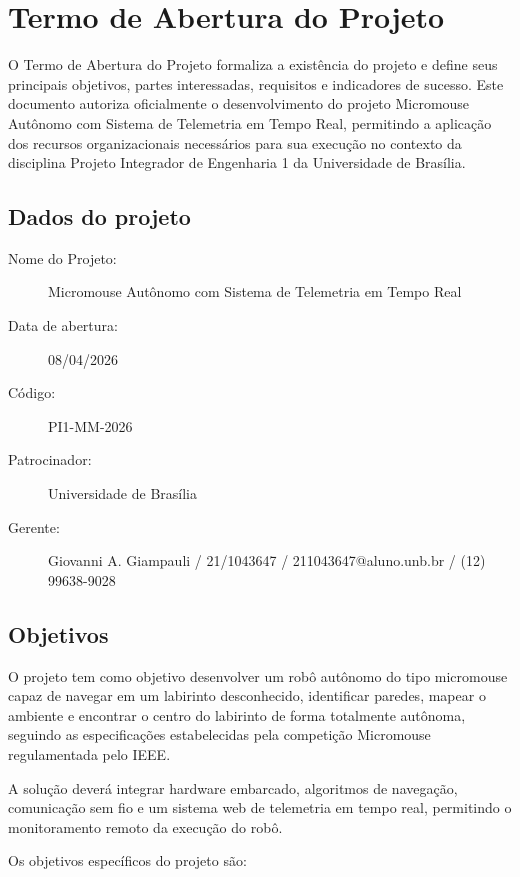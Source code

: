 \chapter{Termo de Abertura do Projeto}

O Termo de Abertura do Projeto formaliza a existência do projeto e define seus principais objetivos, partes interessadas, requisitos e indicadores de sucesso. Este documento autoriza oficialmente o desenvolvimento do projeto Micromouse Autônomo com Sistema de Telemetria em Tempo Real, permitindo a aplicação dos recursos organizacionais necessários para sua execução no contexto da disciplina Projeto Integrador de Engenharia 1 da Universidade de Brasília.

\section{Dados do projeto}
\begin{description}
    \item [Nome do Projeto:] Micromouse Autônomo com Sistema de Telemetria em Tempo Real
    \item [Data de abertura:] 08/04/2026
    \item [Código:] PI1-MM-2026
    \item [Patrocinador:] Universidade de Brasília
    \item [Gerente:] Giovanni A. Giampauli / 21/1043647 / 211043647@aluno.unb.br / (12) 99638-9028
\end{description}

\section{Objetivos}

O projeto tem como objetivo desenvolver um robô autônomo do tipo micromouse capaz de navegar em um labirinto desconhecido, identificar paredes, mapear o ambiente e encontrar o centro do labirinto de forma totalmente autônoma, seguindo as especificações estabelecidas pela competição Micromouse regulamentada pelo IEEE.

A solução deverá integrar hardware embarcado, algoritmos de navegação, comunicação sem fio e um sistema web de telemetria em tempo real, permitindo o monitoramento remoto da execução do robô.

Os objetivos específicos do projeto são:

